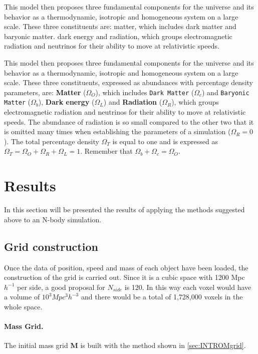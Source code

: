 This model then proposes three fundamental components for the universe and its behavior as a thermodynamic, isotropic and homogeneous system on a large scale. These three constituents are: matter, which includes dark matter and baryonic matter. dark energy and radiation, which groups electromagnetic radiation and neutrinos for their ability to move at relativistic speeds.

This model then proposes three fundamental components for the universe and its behavior as a thermodynamic, isotropic and homogeneous system on a large scale\cite{CARROLL}. These three constituents, expressed as abundances with percentage density parameters, are: \textbf{Matter} (\textbf{$\Omega_O$}), which includes \texttt{Dark Matter} (\textbf{$\Omega_c$}) and \texttt{Baryonic Matter} (\textbf{$\Omega_b$}), \textbf{Dark energy} (\textbf{$\Omega_L$}) and \textbf{Radiation} (\textbf{$\Omega_R$}), which groups electromagnetic radiation and neutrinos for their ability to move at relativistic speeds. The abundance of radiation is so small compared to the other two that it is omitted many times when establishing the parameters of a simulation  (\textbf{$\Omega_R = 0$}). The total percentage density $\Omega_T$ is equal to one and is expressed as $\Omega_T = \Omega_O + \Omega_R + \Omega_L = 1$. Remember that $\Omega_b + \Omega_c = \Omega_O$. 

\newpage
\section{Results}
In this section will be presented the results of applying the methods suggested above to an N-body simulation. 

\subsection{Grid construction}
Once the data of position, speed and mass of each object have been loaded, the construction of the grid is carried out. Since it is a cubic space with 1200 Mpc $h^{-1}$ per side, a good proposal for $N_{side}$ is 120. In this way each voxel would have a volume of $10^3 Mpc^{3}h^{-3}$ and there would be a total of 1,728,000 voxels in the whole space. 

\paragraph{Mass Grid.} The initial mass grid \textbf{M} is built with the method shown in \ref{sec:INTROMgrid}.
